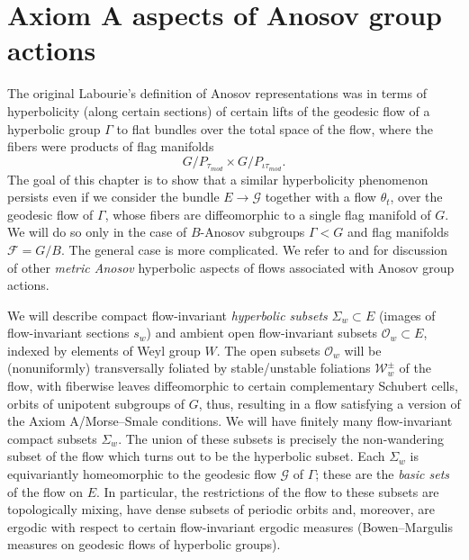 \documentclass[12pt]{amsbook}%
\theoremstyle{definition}
\theoremstyle{remark}
\numberwithin{section}{chapter}
\numberwithin{subsection}{section}
\numberwithin{figure}{chapter}
\def\taumod{\tau_{mod}}
\def\cF{{\mathscr{F}}}
\def\cO{{\mathscr{O}}}
\def\cW{{\mathscr{W}}}
\def\Ga{\Gamma}
\def\cG{{\mathscr{G}}}
\begin{document}
{{%
%
% 



\chapter[Axiom A aspects]{Axiom A aspects of Anosov group actions}\label{sec:Morse-Smale}
The original Labourie's definition of Anosov representations was in terms of hyperbolicity (along certain sections) of  certain lifts of the geodesic 
flow of a hyperbolic group $\Ga$ to flat bundles over the total space of the flow, where the fibers were products of flag manifolds
$$
G/P_{\taumod} \times G/P_{\iota\taumod}.  
$$
 The goal of this chapter is to show that a similar hyperbolicity phenomenon persists even if we consider the bundle $E\to \cG$ together with a flow $\theta_t$, over the geodesic flow of $\Ga$, whose fibers are diffeomorphic to a single flag manifold of $G$. 
 We will do so only in the case of $B$-Anosov subgroups $\Ga< G$ and  flag manifolds $\cF=G/B$. The general case  is more complicated. 
 We refer to \cite{Sambarino-report} and \cite{Delarue-Monclair-Sanders} 
 for discussion of other {\em metric Anosov} hyperbolic aspects of flows associated with Anosov group actions. 
 
 We will describe compact flow-invariant {\em hyperbolic subsets} $\Sigma_w\subset E$ (images of flow-invariant sections $s_w$) and ambient open 
 flow-invariant subsets $\cO_w\subset E$, indexed by elements of Weyl group $W$. The open subsets $\cO_w$ will be (nonuniformly) transversally 
 foliated by stable/unstable foliations $\cW^\pm_w$  of the flow, with fiberwise leaves diffeomorphic to certain complementary Schubert cells, 
 orbits of unipotent subgroups  of $G$, thus, 
 resulting in a flow satisfying a version of the Axiom A/Morse--Smale  conditions. We will have finitely many  
 flow-invariant compact subsets $\Sigma_w$.  
 The union of these subsets is  precisely the non-wandering subset of 
 the flow which turns out to be the hyperbolic subset. Each $\Sigma_w$ is equivariantly homeomorphic to the geodesic 
 flow $\cG$ of $\Ga$; these are the {\em basic sets} of the flow on $E$.  In particular, the restrictions of the flow to these subsets are topologically mixing, 
 have dense subsets of periodic orbits  and, moreover,  are ergodic with respect to certain flow-invariant ergodic measures 
 (Bowen--Margulis measures on geodesic flows of hyperbolic groups).  
 
}}
\end{document}
